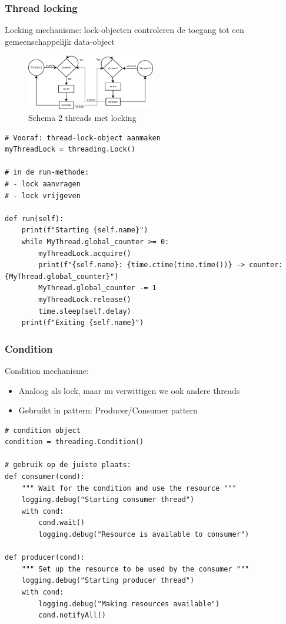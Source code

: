 \documentclass{article}
\begin{document}
\subsubsection{Thread locking}

Locking mechanisme: lock-objecten controleren de toegang tot een gemeenschappelijk data-object

\begin{figure}[H]
    \centering
    \includegraphics[width=0.5\textwidth]{thread-locking.png}
    \caption{Schema 2 threads met locking}
\end{figure}


\begin{verbatim}
# Vooraf: thread-lock-object aanmaken
myThreadLock = threading.Lock()

# in de run-methode:
# - lock aanvragen
# - lock vrijgeven

def run(self):
    print(f"Starting {self.name}")
    while MyThread.global_counter >= 0:
        myThreadLock.acquire()
        print(f"{self.name}: {time.ctime(time.time())} -> counter: {MyThread.global_counter}")
        MyThread.global_counter -= 1
        myThreadLock.release()
        time.sleep(self.delay)
    print(f"Exiting {self.name}")
\end{verbatim}

\subsubsection{Condition}

Condition mechanisme:

\begin{itemize}
    \item Analoog als lock, maar nu verwittigen we ook andere threads
    \item Gebruikt in pattern: Producer/Consumer pattern
\end{itemize}


\begin{verbatim}
# condition object
condition = threading.Condition()

# gebruik op de juiste plaats:
def consumer(cond):
    """ Wait for the condition and use the resource """
    logging.debug("Starting consumer thread")
    with cond:
        cond.wait()
        logging.debug("Resource is available to consumer")
    
def producer(cond):
    """ Set up the resource to be used by the consumer """
    logging.debug("Starting producer thread")
    with cond:
        logging.debug("Making resources available")
        cond.notifyAll()
\end{verbatim}
\end{document}
